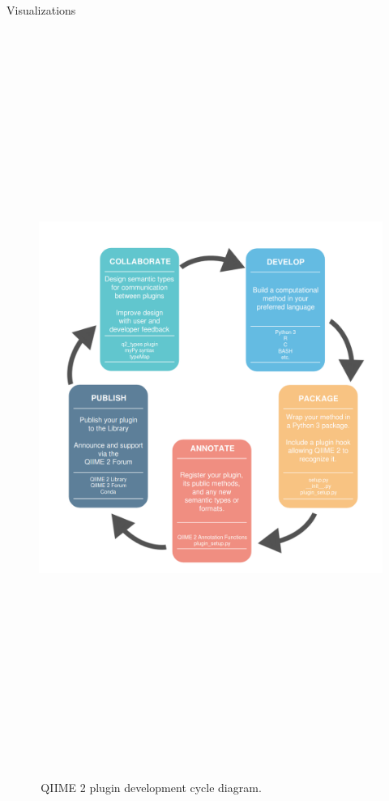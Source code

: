 \documentclass[final]{beamer}
\newlength{\colwidth}
\begin{document}
\begin{frame}[t]
\begin{columns}[t]
\begin{column}{\colwidth}
  \begin{block}{Visualizations}
    \begin{figure}[tph!]
    {\includegraphics[height=24cm]{assets/DevelopmentProcessDiagramFlattop}}
    \caption{\,QIIME 2 plugin development cycle diagram. }
    \label{fig:processDiagram}
    \end{figure}


\end{block}
\end{column}
\end{columns}
\end{frame}
\end{document}

